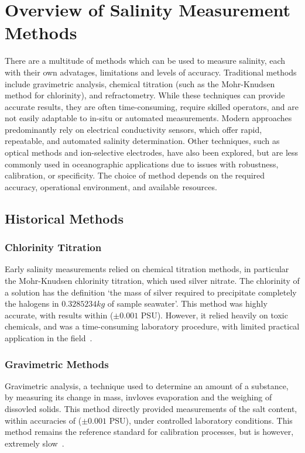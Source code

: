 \section{Overview of Salinity Measurement Methods}
There are a multitude of methods which can be used to measure salinity, each with their own advatages, limitations and levels of accuracy.
Traditional methods include gravimetric analysis, chemical titration (such as the Mohr-Knudsen method for chlorinity), and refractometry. While these techniques can provide accurate results, they are often time-consuming, require skilled operators, and are not easily adaptable to in-situ or automated measurements.
Modern approaches predominantly rely on electrical conductivity sensors, which offer rapid, repeatable, and automated salinity determination.
Other techniques, such as optical methods and ion-selective electrodes, have also been explored, but are less commonly used in oceanographic applications due to issues with robustness, calibration, or specificity.
The choice of method depends on the required accuracy, operational environment, and available resources.


\subsection{Historical Methods}
\subsubsection{Chlorinity Titration}
Early salinity measurements relied on chemical titration methods, in particular the Mohr-Knudsen chlorinity titration, which used silver nitrate.
The chlorinity of a solution has the definition `the mass of silver required to precipitate completely the halogens in $0.3 285 234 kg$ of sample seawater'.
This method was highly accurate, with results within ($\pm0.001$ PSU). However, it relied heavily on toxic chemicals, and was a time-consuming laboratory procedure, with limited practical application in the field~\cite{lewis_pss78}.

\subsubsection{Gravimetric Methods}
Gravimetric analysis, a technique used to determine an amount of a substance, by measuring its change in mass, invloves evaporation and the weighing of dissovled solids.
This method directly provided measurements of the salt content, within accuracies of ($\pm0.001$ PSU), under controlled laboratory conditions.
This method remains the reference standard for calibration processes, but is however, extremely slow~\cite{chemical_ocean}.

